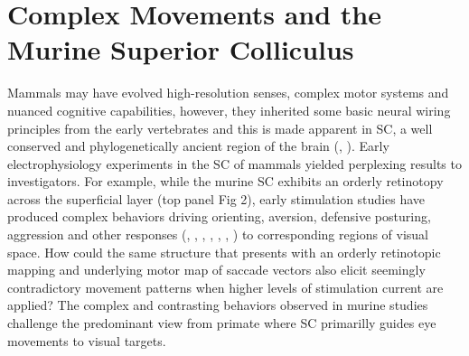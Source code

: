 \documentclass{ar-1col}
\begin{document}
{\section{Complex Movements and the Murine Superior Colliculus} 
Mammals may have evolved high-resolution senses, complex motor systems and nuanced cognitive capabilities, however, they inherited some basic neural wiring principles from the early vertebrates and this is made apparent in SC, a well conserved and phylogenetically ancient region of the brain (\cite{butler2008evolution}, \cite{schneider2014brain}). Early electrophysiology experiments in the SC of mammals yielded perplexing results to investigators. For example, while the murine SC exhibits an orderly retinotopy across the superficial layer (top panel Fig 2), early stimulation studies have produced complex behaviors driving orienting, aversion, defensive posturing, aggression and other responses (\cite{mchaffie1982eye}, \cite{weldon1983rotational}, \cite{imperato1981behavioural}, \cite{olds1963approach}, \cite{valenstein1965independence}, \cite{panksepp1971aggression}, \cite{waldbillig1975attack}) to corresponding regions of visual space. How could the same structure that presents with an orderly retinotopic mapping and underlying motor map of saccade vectors also elicit seemingly contradictory movement patterns when higher levels of stimulation current are applied? The complex and contrasting behaviors observed in murine studies challenge the predominant view from primate where SC primarilly guides eye movements to visual targets.

}
\end{document}
